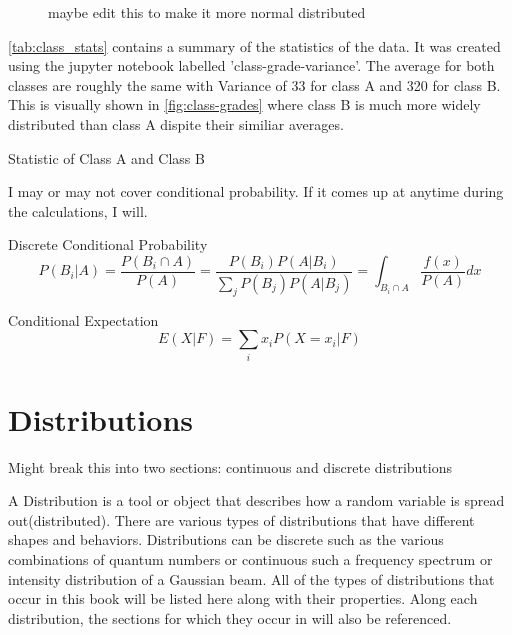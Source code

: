 \documentclass[11pt,a4paper]{book}
\newcommand{\imginput}[1]{} %
\newcommand{\tabinput}[1]{}
\begin{document}
		\begin{figure} [!ht]
			\centering
			\def\svgwidth{\columnwidth}
			\resizebox{14cm}{!}{\imginput{images/class-grades.pdf_tex}}
			\caption{maybe edit this to make it more normal distributed}
			\label{fig:class-grades}
		\end{figure}
		
		\noindent
		\autoref{tab:class_stats} contains a summary of the statistics of the data. It was created using the jupyter notebook labelled  'class-grade-variance'. The average for both classes are roughly the same with Variance of 33 for class A and 320 for class B. This is visually shown in \autoref{fig:class-grades} where class B is much more widely distributed than class A dispite their similiar averages.

		\begin{table} [!ht]
			\centering
			\tabinput{datatables/class_stats.tex}
			\caption{Statistic of Class A and Class B}
			\label{tab:class_stats}
		\end{table}
		
		\noindent
		I may or may not cover conditional probability. If it comes up at anytime during the calculations, I will.
		
		Discrete Conditional Probability
		\begin{equation}
			P(B_i|A)=\dfrac{P(B_i \cap A)}{P(A)}
			=\dfrac{P(B_i)P(A|B_i)}{\displaystyle \sum_j{P(B_j)P(A|B_j)}}
			=\int_{B_i\cap A}{\dfrac{f(x)}{P(A)}dx}
		\end{equation}

		Conditional Expectation
		\begin{equation}
			E(X|F)=\sum_i{x_i P(X=x_i|F)}
		\end{equation}
	\section{Distributions}
		\label{sec:Distribution}
		Might break this into two sections: continuous and discrete distributions
		
		A Distribution is a tool or object that describes how a random variable is spread out(distributed). There are various types of distributions that have different shapes and behaviors. Distributions can be discrete such as the various combinations of quantum numbers or continuous such a frequency spectrum or intensity distribution of a Gaussian beam. All of the types of distributions that occur in this book will be listed here along with their properties. Along each distribution, the sections for which they occur in will also be referenced.
		
\end{document}
